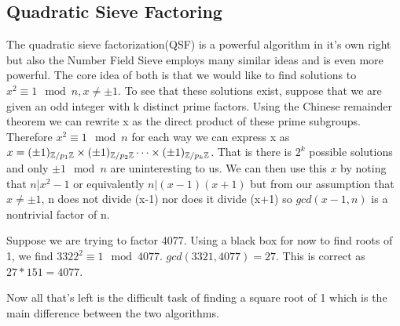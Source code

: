 \documentclass{article}
\begin{document}
\subsection{Quadratic Sieve Factoring}
The quadratic sieve factorization(QSF) is a powerful algorithm in it's own right but also the Number Field Sieve employs many similar ideas and is even more powerful. The core idea of both is that we would like to find solutions to $x^2 \equiv 1 \mod n, x \neq \pm 1$. To see that these solutions exist, suppose that we are given an odd integer with k distinct prime factors. Using the Chinese remainder theorem we can rewrite x as the direct product of these prime subgroups. Therefore $x^2 \equiv 1 \mod n$ for each way we can express x as $x = (\pm 1)_{\mathbb{Z} / p_1 \mathbb{Z}} \times (\pm 1)_{\mathbb{Z} / p_2\mathbb{Z}} \cdots \times (\pm 1)_{\mathbb{Z} / p_k\mathbb{Z}} $. That is there is $2^k$ possible solutions and only $\pm 1 \mod n$ are uninteresting to us.  We can then use this $x$ by noting that $n | x^2 - 1$ or equivalently $n | (x-1) ( x+1)$ but from our assumption that $x \neq \pm 1$, n does not divide (x-1) nor does it divide (x+1) so $gcd(x-1, n)$ is a nontrivial factor of n.
\begin{example}
Suppose we are trying to factor 4077. Using a black box for now to find roots of 1, we find $3322^2 \equiv 1 \mod 4077$. $gcd(3321,4077) = 27$. This is correct as  $27 * 151 = 4077$.
\end{example}
Now all that's left is the difficult task of finding a square root of 1 which is the main difference between the two algorithms.
\end{document}
